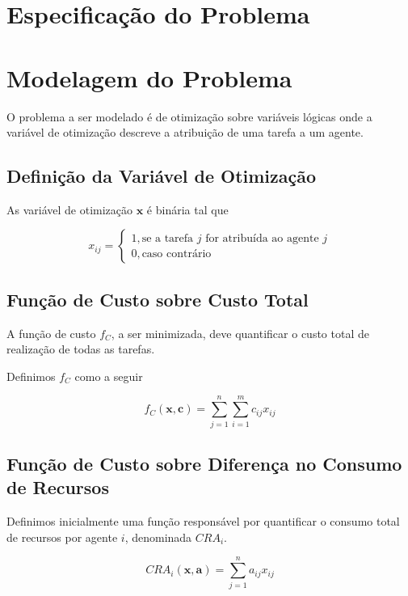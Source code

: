  

\sloppy

\newpage

\section{Especificação do Problema}



\section{Modelagem do Problema}

O problema a ser modelado é de otimização sobre variáveis lógicas onde a
variável de otimização descreve a atribuição de uma tarefa a um agente.

\subsection{Definição da Variável de Otimização}

As variável de otimização $\mathbf{x}$ é binária tal que

$$ x_{ij} = \begin{cases} 1, \text{se a tarefa $j$ for atribuída ao agente $j$}
                       \\ 0, \text{caso contrário}
            \end{cases} $$

\subsection{Função de Custo sobre Custo Total}

A função de custo $f_C$, a ser minimizada, deve quantificar o custo total de
realização de todas as tarefas.

Definimos $f_C$ como a seguir

$$ f_C(\mathbf{x}, \mathbf{c}) = \sum^{n}_{j=1}\sum^{m}_{i=1} c_{ij} x_{ij} $$

\subsection{Função de Custo sobre Diferença no Consumo de Recursos}

Definimos inicialmente uma função responsável por quantificar o consumo
total de recursos por agente $i$, denominada $CRA_i$.

$$ CRA_{i} (\mathbf{x}, \mathbf{a}) =  \sum^{n}_{j=1} a_{ij} x_{ij} $$


